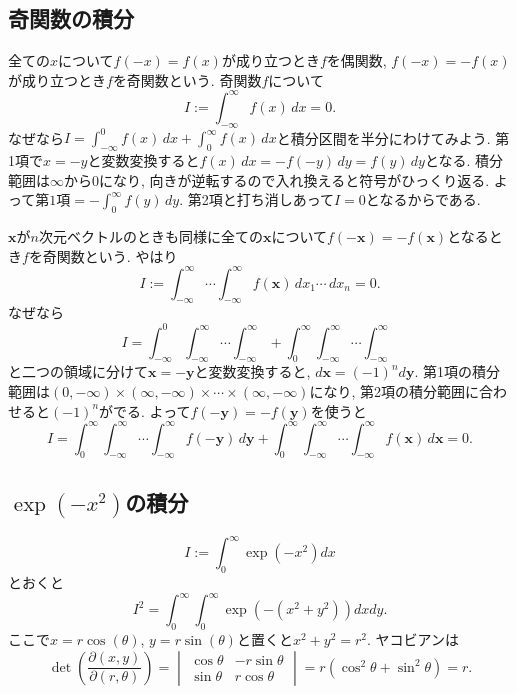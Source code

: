 \subsection{奇関数の積分}

全ての$x$について$f(-x)=f(x)$が成り立つとき$f$を偶関数,
$f(-x)=-f(x)$が成り立つとき$f$を奇関数という.
奇関数$f$について
$$
I:=\int_{-\infty}^\infty f(x) \,dx=0.
$$
なぜなら$I=\int_{-\infty}^0 f(x) \,dx + \int_0^\infty f(x) \,dx$と積分区間を半分にわけてみよう.
第1項で$x=-y$と変数変換すると$f(x)\,dx = -f(-y)\,dy = f(y)\,dy$となる.
積分範囲は$\infty$から$0$になり, 向きが逆転するので入れ換えると符号がひっくり返る.
よって$\text{第1項}=-\int_0^\infty f(y) \,dy$. 第2項と打ち消しあって$I=0$となるからである.
\pagebreak

$\bm{x}$が$n$次元ベクトルのときも同様に全ての$\bm{x}$について$f(-\bm{x})=-f(\bm{x})$となるとき$f$を奇関数という.
やはり
$$
I:=\int_{-\infty}^\infty \cdots \int_{-\infty}^\infty f(\bm{x}) \,dx_1 \cdots \,dx_n=0.
$$
なぜなら
$$I=\int_{-\infty}^0 \int_{-\infty}^\infty \cdots \int_{-\infty}^\infty
   +\int_0^\infty \int_{-\infty}^\infty \cdots \int_{-\infty}^\infty$$
と二つの領域に分けて$\bm{x}=-\bm{y}$と変数変換すると, $d\bm{x}=(-1)^nd\bm{y}$.
第1項の積分範囲は$(0,-\infty) \times (\infty,-\infty) \times \cdots \times (\infty,-\infty)$になり,
第2項の積分範囲に合わせると$(-1)^n$がでる.
よって$f(-\bm{y})=-f(\bm{y})$を使うと
$$I=\int_0^\infty \int_{-\infty}^\infty \cdots \int_{-\infty}^\infty f(-\bm{y})\,d\bm{y}
   +\int_0^\infty \int_{-\infty}^\infty \cdots \int_{-\infty}^\infty f(\bm{x})\,d\bm{x}=0.$$
\vspace{0pt}

\subsection{$\exp\left(-x^2\right)$の積分}

$$I:=\int_0^{\infty} \exp\left(-x^2\right) dx$$
とおくと
$$I^2=\int_0^{\infty} \int_0^{\infty} \exp\left(-(x^2 + y^2)\right) dx dy.$$
ここで$x=r\cos(\theta)$, $y=r\sin(\theta)$と置くと$x^2+y^2=r^2$.
ヤコビアンは
\begin{equation*}
\det\left(\frac{\partial (x, y)}{\partial (r, \theta)}\right) =
  \begin{vmatrix}
    \cos \theta & -r\sin \theta \\
    \sin \theta & r\cos \theta
  \end{vmatrix}
  = r(\cos^2 \theta + \sin^2 \theta) = r.
\end{equation*}

